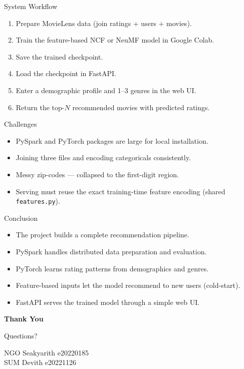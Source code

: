 \documentclass[aspectratio=169]{beamer}
\begin{document}
\begin{frame}{System Workflow}
\begin{enumerate}
  \item Prepare MovieLens data (join ratings + users + movies).
  \item Train the feature-based NCF or NeuMF model in Google Colab.
  \item Save the trained checkpoint.
  \item Load the checkpoint in FastAPI.
  \item Enter a demographic profile and 1--3 genres in the web UI.
  \item Return the top-$N$ recommended movies with predicted ratings.
\end{enumerate}
\end{frame}

\begin{frame}{Challenges}
\begin{itemize}
  \item PySpark and PyTorch packages are large for local installation.
  \item Joining three files and encoding categoricals consistently.
  \item Messy zip-codes --- collapsed to the first-digit region.
  \item Serving must reuse the exact training-time feature encoding (shared \texttt{features.py}).
\end{itemize}
\end{frame}

\begin{frame}{Conclusion}
\begin{itemize}
  \item The project builds a complete recommendation pipeline.
  \item PySpark handles distributed data preparation and evaluation.
  \item PyTorch learns rating patterns from demographics and genres.
  \item Feature-based inputs let the model recommend to new users (cold-start).
  \item FastAPI serves the trained model through a simple web UI.
\end{itemize}
\end{frame}

\begin{frame}[plain]
\begin{center}
\vspace{1.8cm}
{\Huge \bfseries Thank You}

\vspace{0.8cm}
{\Large Questions?}

\vspace{1.0cm}
{\large NGO Seakyarith \quad e20220185}\\
{\large SUM Devith \quad e20221126}
\end{center}
\end{frame}
\end{document}
